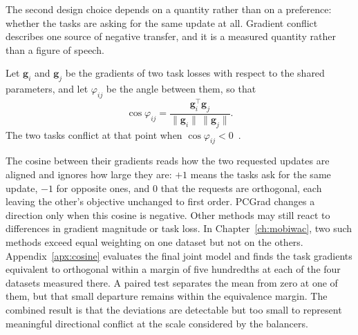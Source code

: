 The second design choice depends on a quantity rather than on a preference: whether the
tasks are asking for the same update at all. Gradient conflict describes one source of
negative transfer, and it is a measured quantity rather than a figure of speech.

\begin{definition}\label{def:fund:conflict}
    Let $\mathbf{g}_i$ and $\mathbf{g}_j$ be the gradients of two task losses with respect
    to the shared parameters, and let $\varphi_{ij}$ be the angle between them, so that
    \begin{equation}\label{eq:fund:cosine}
        \cos\varphi_{ij}
        = \frac{\mathbf{g}_i^{\top}\mathbf{g}_j}
        {\lVert \mathbf{g}_i\rVert\,\lVert \mathbf{g}_j\rVert}.
    \end{equation}
    The two tasks conflict at that point when $\cos\varphi_{ij}<0$~\cite{yu2020pcgrad}.
\end{definition}

The cosine between their gradients reads how the two requested updates are aligned and
ignores how large they are: $+1$ means the tasks ask for the same update, $-1$ for
opposite ones, and $0$ that the requests are orthogonal, each leaving the other's
objective unchanged to first order. PCGrad changes a direction only when this cosine is
negative. Other methods may still react to differences in gradient magnitude or task
loss. In Chapter~\ref{ch:mobiwac}, two such methods exceed equal weighting on one
dataset but not on the others. Appendix~\ref{apx:cosine} evaluates the final joint
model and finds the task gradients equivalent to orthogonal within a margin of five
hundredths at each of the four datasets measured there. A paired test separates the mean
from zero at one of them, but that small departure remains within the equivalence margin.
The combined result is that the deviations are detectable but too small to represent
meaningful directional conflict at the scale considered by the balancers.

